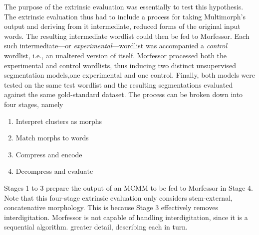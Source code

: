 The purpose of the extrinsic evaluation was essentially to test this hypothesis. 
The extrinsic evaluation thus had to include a process for taking Multimorph's output and deriving from it
intermediate, reduced forms of the original input words. The resulting intermediate
wordlist could then be fed to Morfessor. Each such 
intermediate---or \emph{experimental}---wordlist was accompanied a \emph{control} 
wordlist, i.e., an unaltered version of itself. 
Morfessor processed both the experimental and control wordlists, thus inducing two distinct unsupervised segmentation 
models,one experimental and one control. 
Finally, both models were tested on the same test wordlist and the resulting segmentations evaluated against the same gold-standard dataset. The process can be broken down into four stages, namely
\begin{enumerate}
\item Interpret clusters as morphs
\item Match morphs to words
\item Compress and encode
\item Decompress and evaluate
\end{enumerate}
Stages 1 to 3 prepare the output of an MCMM to be fed to Morfessor in Stage 4. 
Note that this four-stage extrinsic evaluation only considers 
stem-external, concatenative morphology. This is because Stage 3 effectively removes 
interdigitation. Morfessor is not capable of handling interdigitation, since it is 
a sequential algorithm.
 greater detail, describing each in turn.
